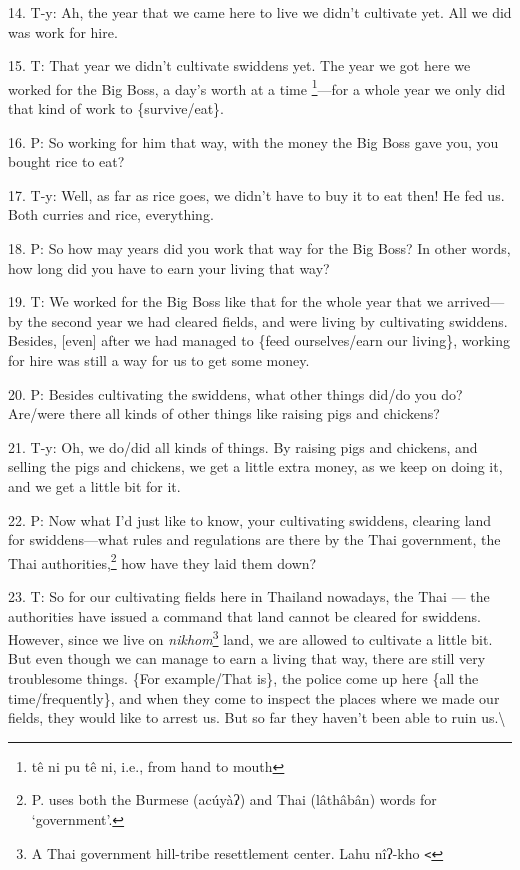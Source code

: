 14. T-y: Ah, the year that we came here to live we didn't cultivate yet. All we
did was work for hire.

15. T: That year we didn't cultivate swiddens yet. The year we got here we worked
for the Big Boss, a day's worth at a time \footnote{tê ni pu tê ni, i.e., from hand to mouth}---for a whole year we only did that
kind of work to \{survive/eat\}.

16. P: So working for him that way, with the money the Big Boss gave you, you bought
rice to eat?

17. T-y: Well, as far as rice goes, we didn't have to buy it to eat then! He fed
us. Both curries and rice, everything.

18. P: So how may years did you work that way for the Big Boss? In other words,
how long did you have to earn your living that way?

19. T: We worked for the Big Boss like that for the whole year that we arrived---by
the second year we had cleared fields, and were living by cultivating swiddens.
Besides, [even] after we had managed to \{feed ourselves/earn our living\}, working
for hire was still a way for us to get some money.

20. P: Besides cultivating the swiddens, what other things did/do you do? Are/were
there all kinds of other things like raising pigs and chickens?

21. T-y: Oh, we do/did all kinds of things. By raising pigs and chickens, and selling
the pigs and chickens, we get a little extra money, as we keep on doing it, and
we get a little bit for it.

22. P: Now what I'd just like to know, your cultivating swiddens, clearing land
for swiddens---what rules and regulations are there by the Thai government, the
Thai authorities,\footnote{P. uses both the Burmese (acúyàʔ) and Thai (lâthâbân) words for `government'.} how have they laid them down?

23. T: So for our cultivating fields here in Thailand nowadays, the Thai --- the
authorities have issued a command that land cannot be cleared for swiddens. However,
since we live on \textit{nikhom}\footnote{A Thai government hill-tribe resettlement center. Lahu nîʔ-kho \texttt{<}} land, we are allowed to cultivate a little
bit. But even though we can manage to earn a living that way, there are still very
troublesome things. \{For example/That is\}, the police come up here \{all the
time/frequently\}, and when they come to inspect the places where we made our fields,
they would like to arrest us. But so far they haven't been able to ruin us.\textbackslash{}

